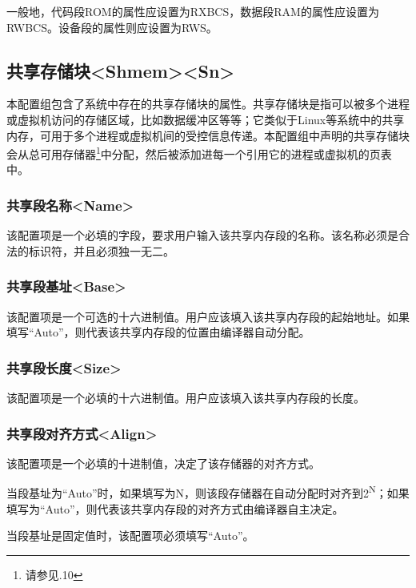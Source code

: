 一般地，代码段ROM的属性应设置为RXBCS，数据段RAM的属性应设置为RWBCS。设备段的属性则应设置为RWS。

\subsection{共享存储块<Shmem><Sn>{}}\label{subsec:5-3-11}

本配置组包含了系统中存在的共享存储块的属性。共享存储块是指可以被多个进程或虚拟机访问的存储区域，比如数据缓冲区等等；它类似于Linux等系统中的共享内存，可用于多个进程或虚拟机间的受控信息传递。本配置组中声明的共享存储块会从总可用存储器\footnote{请参见.10}中分配，然后被添加进每一个引用它的进程或虚拟机的页表中。

\subsubsection{共享段名称<Name>{}}\label{subsubsec:5-3-11-1}

该配置项是一个必填的字段，要求用户输入该共享内存段的名称。该名称必须是合法的标识符，并且必须独一无二。

\subsubsection{共享段基址<Base>{}}\label{subsubsec:5-3-11-2}

该配置项是一个可选的十六进制值。用户应该填入该共享内存段的起始地址。如果填写``Auto''，则代表该共享内存段的位置由编译器自动分配。

\subsubsection{共享段长度<Size>{}}\label{subsubsec:5-3-11-3}

该配置项是一个必填的十六进制值。用户应该填入该共享内存段的长度。

\subsubsection{共享段对齐方式<Align>{}}\label{subsubsec:5-3-11-4}

该配置项是一个必填的十进制值，决定了该存储器的对齐方式。

当段基址为``Auto''时，如果填写为N，则该段存储器在自动分配时对齐到2\textsuperscript{N}；如果填写为``Auto''，则代表该共享内存段的对齐方式由编译器自主决定。

当段基址是固定值时，该配置项必须填写``Auto''。


